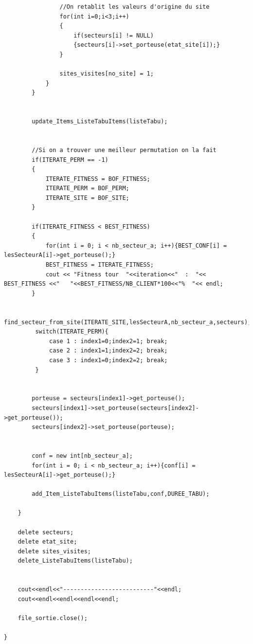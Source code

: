 \documentclass[a4paper, 11pt]{report}
\begin{document}
\begin{lstlisting}
                //On retablit les valeurs d'origine du site
                for(int i=0;i<3;i++)
                {
                    if(secteurs[i] != NULL)
                    {secteurs[i]->set_porteuse(etat_site[i]);}
                }

                sites_visites[no_site] = 1;
            }
        }


        update_Items_ListeTabuItems(listeTabu);


        //Si on a trouver une meilleur permutation on la fait
        if(ITERATE_PERM == -1)
        {
            ITERATE_FITNESS = BOF_FITNESS;
            ITERATE_PERM = BOF_PERM;
            ITERATE_SITE = BOF_SITE;
        }

        if(ITERATE_FITNESS < BEST_FITNESS)
        {
            for(int i = 0; i < nb_secteur_a; i++){BEST_CONF[i] = lesSecteurA[i]->get_porteuse();}
            BEST_FITNESS = ITERATE_FITNESS;
            cout << "Fitness tour  "<<iteration<<"  :  "<< BEST_FITNESS <<"   "<<BEST_FITNESS/NB_CLIENT*100<<"%  "<< endl;
        }

        find_secteur_from_site(ITERATE_SITE,lesSecteurA,nb_secteur_a,secteurs);
         switch(ITERATE_PERM){
             case 1 : index1=0;index2=1; break;
             case 2 : index1=1;index2=2; break;
             case 3 : index1=0;index2=2; break;
         }


        porteuse = secteurs[index1]->get_porteuse();
        secteurs[index1]->set_porteuse(secteurs[index2]->get_porteuse());
        secteurs[index2]->set_porteuse(porteuse);


        conf = new int[nb_secteur_a];
        for(int i = 0; i < nb_secteur_a; i++){conf[i] = lesSecteurA[i]->get_porteuse();}

        add_Item_ListeTabuItems(listeTabu,conf,DUREE_TABU);

    }

    delete secteurs;
    delete etat_site;
    delete sites_visites;
    delete_ListeTabuItems(listeTabu);


    cout<<endl<<"--------------------------"<<endl;
    cout<<endl<<endl<<endl<<endl;

    file_sortie.close();

}
\end{lstlisting}
\end{document}
